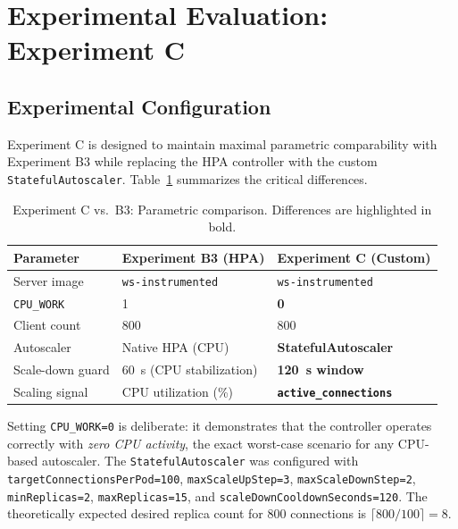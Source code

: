 \documentclass[twocolumn]{svjour3}
\begin{document}
\section{Experimental Evaluation: Experiment C}
\label{sec:evaluation}

\subsection{Experimental Configuration}

Experiment C is designed to maintain maximal parametric comparability with Experiment B3 while replacing the HPA controller with the custom \texttt{StatefulAutoscaler}. Table~\ref{tab:exp_c_setup} summarizes the critical differences.

\begin{table}[ht]
\centering
\caption{Experiment C vs.\ B3: Parametric comparison. Differences are highlighted in bold.}
\label{tab:exp_c_setup}
\begin{tabular}{@{}lll@{}}
\toprule
\rowcolor{gray!12}
\textbf{Parameter} & \textbf{Experiment B3 (HPA)} & \textbf{Experiment C (Custom)} \\
\midrule
Server image & \texttt{ws-instrumented} & \texttt{ws-instrumented} \\
\texttt{CPU\_WORK} & 1 & \textbf{0} \\
Client count & 800 & 800 \\
Autoscaler & Native HPA (CPU) & \textbf{StatefulAutoscaler} \\
Scale-down guard & 60~s (CPU stabilization) & \textbf{120~s window} \\
Scaling signal & CPU utilization (\%) & \textbf{\texttt{active\_connections}} \\
\bottomrule
\end{tabular}
\end{table}

Setting \texttt{CPU\_WORK=0} is deliberate: it demonstrates that the controller operates correctly with \textit{zero CPU activity}, the exact worst-case scenario for any CPU-based autoscaler. The \texttt{StatefulAutoscaler} was configured with \texttt{targetConnectionsPerPod=100}, \texttt{maxScaleUpStep=3}, \texttt{maxScaleDownStep=2}, \texttt{minReplicas=2}, \texttt{maxReplicas=15}, and \texttt{scaleDownCooldownSeconds=120}. The theoretically expected desired replica count for 800 connections is $\lceil 800/100 \rceil = 8$.
\end{document}
